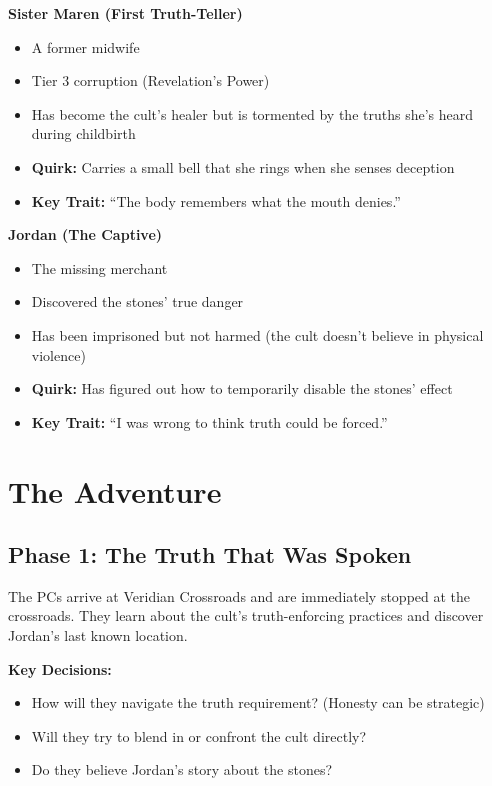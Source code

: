 \documentclass[11pt]{article}
\newcommand{\keypoint}[1]{\par\noindent\textbf{\textcolor{accentorange}{#1}}}
\newcommand{\npctitle}[1]{\par\noindent\textbf{#1}\par}
\begin{document}
\npctitle{Sister Maren (First Truth-Teller)}
\begin{itemize}[leftmargin=*]
    \item A former midwife
    \item Tier 3 corruption (Revelation's Power)
    \item Has become the cult's healer but is tormented by the truths she's heard during childbirth
    \item \textbf{Quirk:} Carries a small bell that she rings when she senses deception
    \item \textbf{Key Trait:} ``The body remembers what the mouth denies.''
\end{itemize}

\npctitle{Jordan (The Captive)}
\begin{itemize}[leftmargin=*]
    \item The missing merchant
    \item Discovered the stones' true danger
    \item Has been imprisoned but not harmed (the cult doesn't believe in physical violence)
    \item \textbf{Quirk:} Has figured out how to temporarily disable the stones' effect
    \item \textbf{Key Trait:} ``I was wrong to think truth could be forced.''
\end{itemize}

\section{The Adventure}

\subsection{Phase 1: The Truth That Was Spoken}
The PCs arrive at Veridian Crossroads and are immediately stopped at the crossroads. They learn about the cult's truth-enforcing practices and discover Jordan's last known location.

\keypoint{Key Decisions:}
\begin{itemize}[leftmargin=*]
    \item How will they navigate the truth requirement? (Honesty can be strategic)
    \item Will they try to blend in or confront the cult directly?
    \item Do they believe Jordan's story about the stones?
\end{itemize}
\end{document}
